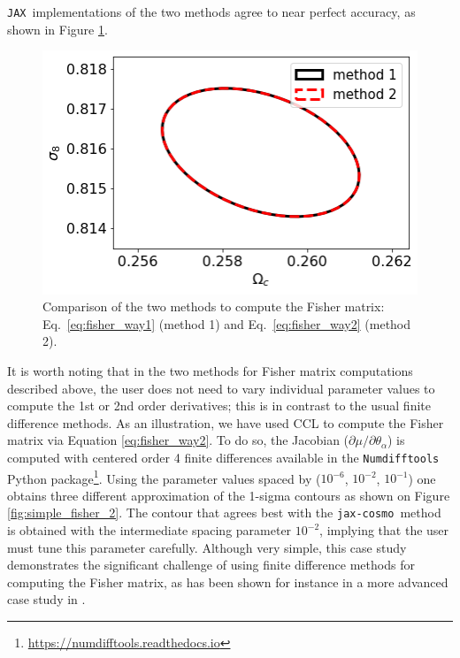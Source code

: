 \documentclass[twocolumn,twocolappendix,nofootinbib,iop]{openjournal}
\newcommand{\jaxcosmo}{\texttt{jax-cosmo}}
\newcommand{\jax}{\texttt{JAX}}
\begin{document}
\jax\ implementations of the two methods agree to near perfect accuracy, as shown in Figure \ref{fig:simple_fisher_1}.
\begin{figure}
    \centering
    \includegraphics[width=0.7\columnwidth]{figures/simple_fisher_1.png}
    \caption{Comparison of the two methods to compute the Fisher matrix: Eq.~\ref{eq:fisher_way1} (method 1) and Eq.~\ref{eq:fisher_way2} (method 2).} 
    \label{fig:simple_fisher_1}
\end{figure}
%
It is worth noting that in the two methods for Fisher matrix computations described above, the user does not need to vary individual parameter values to compute the 1st or 2nd order derivatives; this is in contrast to the usual finite difference methods. As an illustration, we have used CCL to compute the Fisher matrix via Equation \ref{eq:fisher_way2}. To do so, the Jacobian ($\partial \mu/\partial\theta_\alpha$) is computed with centered  order 4 finite differences available in the \texttt{Numdifftools} Python package\footnote{\url{https://numdifftools.readthedocs.io}}. Using the parameter values spaced by ($10^{-6}$, $10^{-2}$, $10^{-1}$) one obtains three different approximation of the 1-sigma contours as shown on Figure \ref{fig:simple_fisher_2}. The contour that agrees best with the \jaxcosmo\ method is obtained with the intermediate spacing parameter $10^{-2}$, implying that the user must tune this parameter carefully. Although very simple, this case study demonstrates the significant challenge of using finite difference methods for computing the Fisher matrix, as has been shown for instance in a more advanced case study in \citet{2021arXiv210100298B}. 
\end{document}
